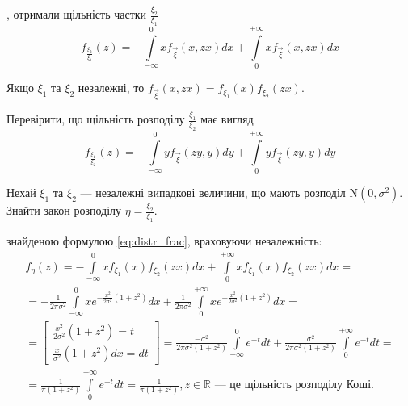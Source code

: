 , отримали щільність частки $\frac{\xi_2}{\xi_1}$ 
\begin{equation}\label{eq:distr_frac}
    f_{\frac{\xi_2}{\xi_1}} (z)= -\int\limits_{-\infty}^0 xf_{\vec{\xi}}(x, zx)dx + 
    \int\limits_0^{+\infty}xf_{\vec{\xi}}(x, zx)dx    
\end{equation}

\begin{remark}
    Якщо $\xi_1$ та $\xi_2$ незалежні, то $f_{\vec{\xi}}(x, zx) = 
    f_{\xi_1}(x)f_{\xi_2}(zx)$.
\end{remark}

\begin{exercise}
    Перевірити, що щільність розподілу $\frac{\xi_1}{\xi_2}$ має вигляд
    \begin{equation}
        f_{\frac{\xi_1}{\xi_2}}(z) = -\int\limits_{-\infty}^0 y f_{\vec {\xi}}(zy, y) dy + \int\limits_0^{+\infty}
        yf_{\vec{\xi}}(zy, y)dy
    \end{equation}
\end{exercise}

\begin{example}
    Нехай $\xi_1$ та $\xi_2$ --- незалежні випадкові величини, що мають розподіл $\mathrm{N}(0, \sigma^2)$. Знайти закон розподілу $\eta = \frac{\xi_2}{\xi_1}$.

     знайденою формулою \eqref{eq:distr_frac}, враховуючи незалежність:
    \begin{gather*}
        f_\eta(z) = - \int\limits_{-\infty}^0 x f_{\xi_1}(x) f_{\xi_2}(zx) dx + 
        \int\limits_{0}^{+\infty} x f_{\xi_1}(x) f_{\xi_2}(zx) dx = 
        \\
        =
        -\frac{1}{2\pi\sigma^2}\int\limits_{-\infty}^0 x e^{-\frac{x^2}{2\sigma^2}\left(1+z^2\right)} dx
        +
        \frac{1}{2\pi\sigma^2}\int\limits_0^{+\infty} x e^{-\frac{x^2}{2\sigma^2}\left(1+z^2\right)}dx = 
        \\
        = \left[
        \begin{array}{c}
            \frac{x^2}{2\sigma^2}\left(1+z^2\right) = t \\
            \frac{x}{\sigma^2}\left(1+z^2\right)dx = dt 
        \end{array}
        \right]
        =
        \frac{-\sigma^2}{2\pi\sigma^2\left(1+z^2\right)}\int\limits_{+\infty}^0 e^{-t} dt
        +
        \frac{\sigma^2}{2\pi\sigma^2\left(1+z^2\right)}\int\limits^{+\infty}_0 e^{-t} dt = 
        \\
        = \frac{1}{\pi(1+z^2)}\int\limits_0^{+\infty}e^{-t}dt = \frac{1}{\pi(1+z^2)}, z \in \mathbb{R}
        \text{ --- це щільність розподілу Коші.}
    \end{gather*}
\end{example}

